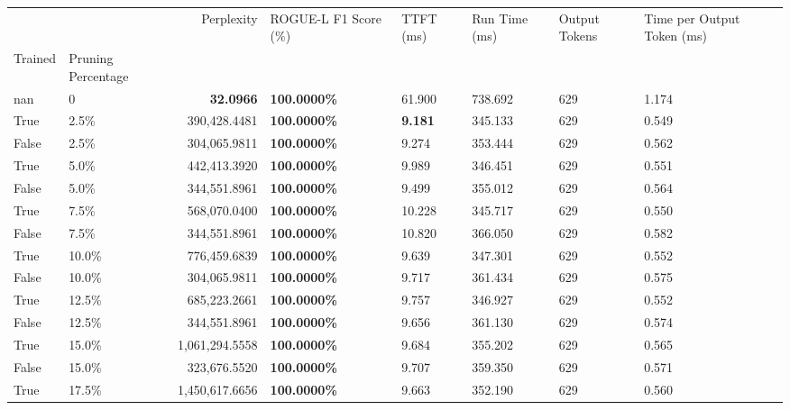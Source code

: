 \begin{table}[H]
\label{tab:evaluation-pipeline-1}
\begin{tabular}{|m{}| m{}| r | R{0.13\textwidth}| R{0.09\textwidth}| R{0.09\textwidth}| R{0.09\textwidth}| R{0.11\textwidth}}
\toprule
 &  & Perplexity & ROGUE-L F1 Score (\%) & TTFT (ms) & Run Time (ms) & Output Tokens & Time per Output Token (ms) \\
Trained & Pruning Percentage &  &  &  &  &  &  \\
\midrule
nan & 0 & \bfseries 32.0966 & \bfseries 100.0000\% & 61.900 & 738.692 & 629 & 1.174 \\
True & 2.5\% & 390,428.4481 & \bfseries \color{red} 100.0000\% & \bfseries \color{red} 9.181 & 345.133 & 629 & 0.549 \\
False & 2.5\% & \color{red} 304,065.9811 & \bfseries \color{red} 100.0000\% & 9.274 & 353.444 & 629 & 0.562 \\
True & 5.0\% & 442,413.3920 & \bfseries \color{red} 100.0000\% & 9.989 & 346.451 & 629 & 0.551 \\
False & 5.0\% & 344,551.8961 & \bfseries \color{red} 100.0000\% & 9.499 & 355.012 & 629 & 0.564 \\
True & 7.5\% & 568,070.0400 & \bfseries \color{red} 100.0000\% & 10.228 & 345.717 & 629 & 0.550 \\
False & 7.5\% & 344,551.8961 & \bfseries \color{red} 100.0000\% & 10.820 & 366.050 & 629 & 0.582 \\
True & 10.0\% & 776,459.6839 & \bfseries \color{red} 100.0000\% & 9.639 & 347.301 & 629 & 0.552 \\
False & 10.0\% & \color{red} 304,065.9811 & \bfseries \color{red} 100.0000\% & 9.717 & 361.434 & 629 & 0.575 \\
True & 12.5\% & 685,223.2661 & \bfseries \color{red} 100.0000\% & 9.757 & 346.927 & 629 & 0.552 \\
False & 12.5\% & 344,551.8961 & \bfseries \color{red} 100.0000\% & 9.656 & 361.130 & 629 & 0.574 \\
True & 15.0\% & 1,061,294.5558 & \bfseries \color{red} 100.0000\% & 9.684 & 355.202 & 629 & 0.565 \\
False & 15.0\% & 323,676.5520 & \bfseries \color{red} 100.0000\% & 9.707 & 359.350 & 629 & 0.571 \\
True & 17.5\% & 1,450,617.6656 & \bfseries \color{red} 100.0000\% & 9.663 & 352.190 & 629 & 0.560 \\

\end{tabular}
\end{table}
